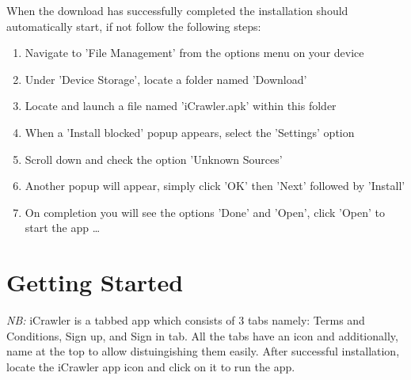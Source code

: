\documentclass[hidelinks, 12pt, oneside]{article}
\begin{document}
	When the download has successfully completed the installation should automatically start, if not follow the following steps:\newline
	  
	 \begin{enumerate}
 	 	\item Navigate to 'File Management' from the options menu on your device
 	 	\item Under 'Device Storage', locate a folder named 'Download'
 	 	\item Locate and launch a file named 'iCrawler.apk' within this folder
 	 	\item When a 'Install blocked' popup appears, select the 'Settings' option
 	 	\item Scroll down and check the option 'Unknown Sources'
 	 	\item Another popup will appear, simply click 'OK' then 'Next' followed by 'Install'
 	 	\item On completion you will see the options 'Done' and 'Open', click 'Open' to start the app \ldots
 	\end{enumerate}\newpage


	\section{Getting Started}
	\emph{NB:} iCrawler is a tabbed app which consists of 3 tabs namely: Terms and Conditions, Sign up, and Sign in tab. All the tabs have an icon and additionally, name at the top to allow distuingishing them easily.\newline \newline
	After successful installation, locate the iCrawler app icon and click on it to run the app.\newpage
	
\end{document}
